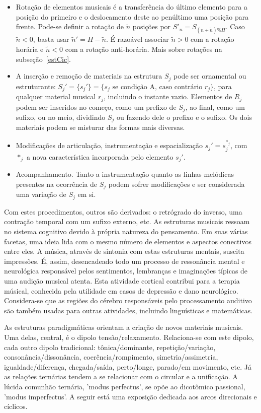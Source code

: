 \begin{itemize}
    \item Rotação de elementos musicais é a transferência do último elemento para a posição do primeiro e o deslocamento deste ao penúltimo uma posição para frente. Pode-se definir a rotação de $\tilde{n}$ posições por $S'_n=S_{(n+\tilde{n})\%H}$. Caso $\tilde{n}<0$, basta usar $\tilde{n}'=H-\tilde{n}$. É razoável associar $\tilde{n}>0$ com a rotação horária e $\tilde{n}<0$ com a rotação anti-horária. Mais sobre rotações na subseção~\ref{estCic}.
    \item A inserção e remoção de materiais na estrutura $S_j$ pode ser ornamental ou estruturante: $S_j'=\{s_j'\}=\{s_j \text{ se condição A, caso contrário } r_j\}$, para qualquer material musical $r_j$, incluindo o instante vazio. Elementos de $R_j$ podem ser inseridos no começo, como um prefixo de $S_j$, ao final, como um sufixo, ou no meio, dividindo $S_j$ ou fazendo dele o prefixo e o sufixo. Os dois materiais podem se misturar das formas mais diversas.
    \item Modificações de articulação, instrumentação e espacialização $s_j'=s_j^{*_j}$, com $*_j$ a nova característica incorporada pelo elemento $s_j'$.
    \item Acompanhamento. Tanto a instrumentação quanto as linhas melódicas presentes na ocorrência de $S_j$ podem sofrer modificações e ser considerada uma variação de $S_j$ em si.
\end{itemize}

Com estes procedimentos, outros são derivados: o retrógrado do inverso, uma contração temporal com um sufixo externo, etc.
As estruturas musicais ressoam no sistema cognitivo devido à própria natureza do pensamento. Em suas várias facetas,
uma ideia lida com o mesmo número de elementos e aspectos conectivos entre eles.
A música, através de sintonia com estas estruturas mentais, suscita impressões. É, assim, desencadeado
todo um processo de ressonância mental e neurológica responsável pelos sentimentos, lembranças e imaginações
típicas de uma audição musical atenta. Esta atividade cortical contribui para a terapia
músical, conhecida pela utilidade em casos de depressão e dano neurológico. Considera-se que as regiões do cérebro responsáveis pelo processamento auditivo são também usadas para outras atividades, incluindo linguísticas e matemáticas.\cite{Sacks,Roederer}

As estruturas paradigmáticas orientam a criação de novos materiais musicais. Uma delas, central, é o dipolo tensão/relaxamento. Relaciona-se com este dipolo, cada outro dipolo tradicional: tônica/dominante, repetição/variação, consonância/dissonância, coerência/rompimento, simetria/assimetria, igualdade/diferença, chegada/saída, perto/longe, parado/em movimento, etc. Já as relações ternárias tendem a se relacionar com o circular e a unificação. A lúcida comunhão ternária, 'modus perfectus', se opõe ao dicotômico passional, 'modus imperfectus'.
A seguir está uma exposição  dedicada aos arcos direcionais 
e cíclicos.

